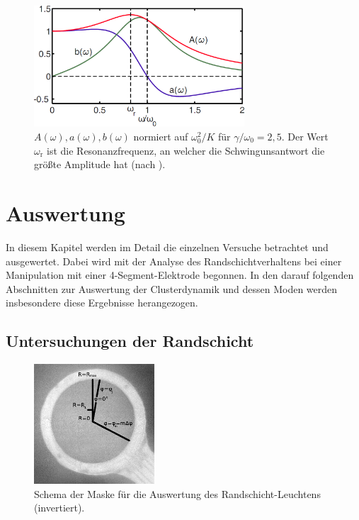 \documentclass[numbers=noenddot,a4paper]{scrartcl}
\newcommand{\ix}[1]{_\text{#1}}
\begin{document}
				\begin{figure}[H]
					\centering
					\includegraphics[width=0.7\textwidth,height=0.35\textwidth]{figs/amplitud.png}
					\caption{$A\left(\omega\right), a\left(\omega\right), b\left(\omega\right)$ normiert auf $\omega\ix{0}^2/K $ für $\gamma/\omega\ix{0}=2,5$. Der Wert $\omega\ix{r}$ ist die Resonanzfrequenz, an welcher die Schwingunsantwort die größte Amplitude hat (nach \cite{Carstensen11}).}
					\label{img:amplitud}
				\end{figure}

	\newpage

	\section{Auswertung}\label{sec:auswert}

		In diesem Kapitel werden im Detail die einzelnen Versuche betrachtet und ausgewertet. Dabei wird mit der Analyse des Randschichtverhaltens bei einer Manipulation mit einer 4-Segment-Elektrode begonnen. In den darauf folgenden Abschnitten zur Auswertung der Clusterdynamik und dessen Moden werden insbesondere diese Ergebnisse herangezogen.

        \subsection{Untersuchungen der Randschicht}

                \begin{figure}
                    \centering
                    \includegraphics[width=0.4\textwidth,height=0.4\textwidth]{figs/auswertung/randanalysemaske.png}
                    \caption{Schema der Maske für die Auswertung des Randschicht-Leuchtens (invertiert).}
                    \label{img:randmaske}
                \end{figure}
\end{document}
